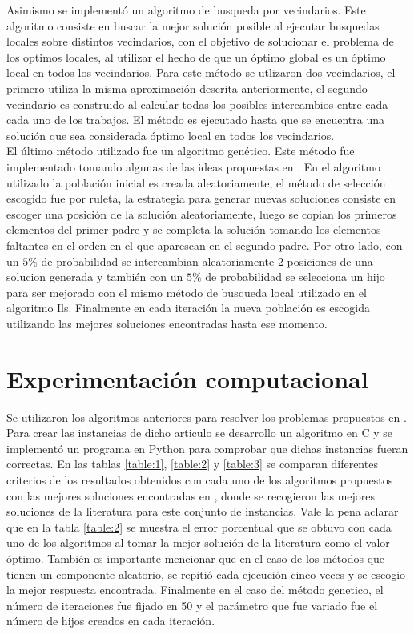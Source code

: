 \documentclass[10pt, twoside]{article}
\begin{document}
Asimismo se implementó un algoritmo de busqueda por vecindarios. Este
algoritmo consiste en buscar la mejor solución posible al ejecutar busquedas
locales sobre distintos vecindarios, con el objetivo de solucionar el problema
de los optimos locales, al utilizar el hecho de que un óptimo global es un óptimo
local en todos los vecindarios. Para este método se utlizaron dos vecindarios,
el primero utiliza la misma aproximación descrita anteriormente, el
segundo vecindario es construido al calcular todas los posibles
intercambios entre cada cada uno de los trabajos. El método es ejecutado hasta
que se encuentra una solución que sea considerada óptimo local en todos los
vecindarios.\\

El último método utilizado fue un algoritmo genético. Este método
fue implementado tomando algunas de las ideas propuestas en \cite{genetic2}.
En el algoritmo utilizado la población inicial es creada aleatoriamente,
el método de selección escogido fue por ruleta, la estrategia para generar
nuevas soluciones consiste en escoger una posición de la solución aleatoriamente,
luego se copian los primeros elementos del primer padre y se completa la solución
tomando los elementos faltantes en el orden en el que aparescan en el segundo padre.
Por otro lado, con un $5\%$ de probabilidad se intercambian aleatoriamente 2
posiciones de una solucion generada y también con un $5\%$ de probabilidad se
selecciona un hijo para ser mejorado con el mismo método de busqueda local
utilizado en el algoritmo Ils. Finalmente en cada iteración la nueva población
es escogida utilizando las mejores soluciones encontradas hasta ese momento. 

\section{Experimentación computacional}

Se utilizaron los algoritmos anteriores para resolver los problemas
propuestos en \cite{dataset}. Para crear las instancias de dicho articulo se desarrollo
un algoritmo en C y se implementó un programa en Python para comprobar que dichas
instancias fueran correctas. En las tablas \ref{table:1}, \ref{table:2} y
\ref{table:3} se comparan diferentes criterios de los resultados obtenidos con
cada uno de los algoritmos propuestos con las mejores soluciones encontradas en
\cite{literature}, donde se recogieron las mejores soluciones de la literatura para este
conjunto de instancias. Vale la pena aclarar que en la tabla \ref{table:2} se
muestra el error porcentual que se obtuvo con cada uno de los algoritmos al tomar la mejor
solución de la literatura como el valor óptimo. También es importante mencionar
que en el caso de los métodos que tienen un componente aleatorio, se repitió
cada ejecución cinco veces y se escogio la mejor respuesta encontrada. Finalmente
en el caso del método genetico, el número de iteraciones fue fijado en 50 y 
el parámetro que fue variado fue el número de hijos creados en cada iteración.
\end{document}
